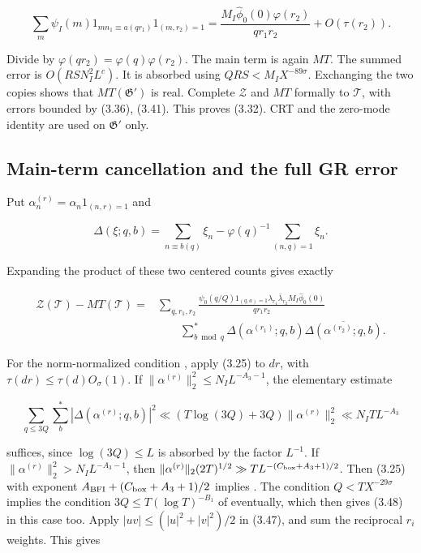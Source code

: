 \[
\sum_m\psi_I(m)1_{mn_1\equiv a(qr_1)}1_{(m,r_2)=1}
 =\frac{M_I\widehat\phi_0(0)\varphi(r_2)}{qr_1r_2}
   +O(\tau(r_2)).
\tag{3.45}
\]

Divide by $\varphi(qr_2)=\varphi(q)\varphi(r_2)$.
The main term is again $MT$.
The summed error is $O(RSN_I^2L^c)$.
It is absorbed using $QRS<M_IX^{-89\sigma}$.
Exchanging the two copies shows that $MT(\mathfrak G')$ is real.
Complete $\mathcal Z$ and $MT$ formally to $\mathcal T$, with errors bounded by (3.36), (3.41).
This proves (3.32).
CRT and the zero-mode identity are used on $\mathfrak G'$ only.

\subsection{Main-term cancellation and the full GR error}

Put $\alpha^{(r)}_n=\alpha_n1_{(n,r)=1}$ and

\[
\Delta(\xi;q,b)=\sum_{n\equiv b(q)}\xi_n-
                  \varphi(q)^{-1}\sum_{(n,q)=1}\xi_n.
\tag{3.46}
\]

Expanding the product of these two centered counts gives exactly

\[
\begin{aligned}
\mathcal Z(\mathcal T)-MT(\mathcal T)
={}&\sum_{q,r_1,r_2}\frac{\psi_0(q/Q)1_{(q,a)=1}
               \lambda_{r_1}\bar\lambda_{r_2}M_I\widehat\phi_0(0)}{qr_1r_2}\\
&\qquad\sum_{b\bmod q}^{*}\Delta(\alpha^{(r_1)};q,b)
                  \overline{\Delta(\alpha^{(r_2)};q,b)}.
\end{aligned}
\tag{3.47}
\]

For the norm-normalized condition \cite[(A2)]{BFI86}, apply (3.25) to $dr$, with
$\tau(dr)\le\tau(d)O_\sigma(1)$. If
$\|\alpha^{(r)}\|_2^2\le N_IL^{-A_3-1}$, the elementary estimate

\[
\sum_{q\le3Q}\sum_b^*|\Delta(\alpha^{(r)};q,b)|^2
 \ll (T\log(3Q)+3Q)\|\alpha^{(r)}\|_2^2
 \ll N_ITL^{-A_3}
\tag{3.48}
\]

\noindent suffices, since $\log(3Q)\le L$ is absorbed by the factor $L^{-1}$.
If $\|\alpha^{(r)}\|_2^2>N_IL^{-A_3-1}$, then $\|\alpha^{(r)}\|_2(2T)^{1/2}\gg TL^{-(C_{\rm box}+A_3+1)/2}$.
Then (3.25) with exponent
$A_{\rm BFI}+(C_{\rm box}+A_3+1)/2$ implies \cite[(A2)]{BFI86}.
The condition $Q<TX^{-29\sigma}$ implies the condition
$3Q\le T(\log T)^{-B_1}$ of \cite[Theorem~0(a)]{BFI86} eventually,
which then gives (3.48) in this case too.
Apply $|uv|\le(|u|^2+|v|^2)/2$ in (3.47), and sum
the reciprocal $r_i$ weights. This gives

